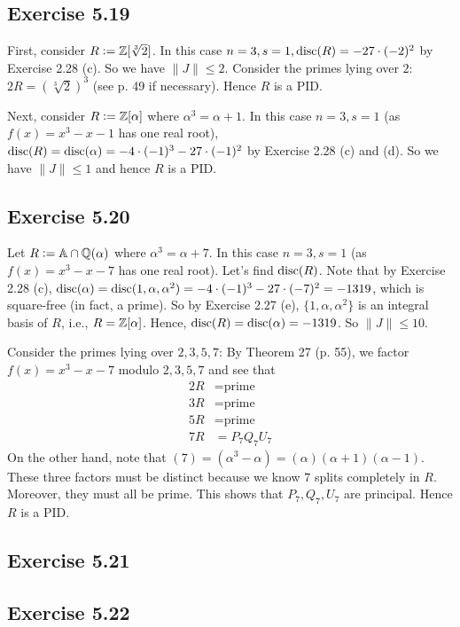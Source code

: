 \documentclass[../Marcus.tex]{subfiles}
\begin{document}
\subsection*{Exercise 5.19}

First, consider $R:=\mathbb{Z}[\sqrt[3]{2}]$. In this case $n=3,s=1,\operatorname{disc}(R) = -27\cdot(-2)^2$ by Exercise 2.28 (c). So we have $\|J\| \leq 2$. Consider the primes lying over $2$: $2R=(\sqrt[3]{2})^3$ (see p. 49 if necessary). Hence $R$ is a PID.

Next, consider $R:=\mathbb{Z}[\alpha]$ where $\alpha^3=\alpha+1$. In this case $n=3,s=1$ (as $f(x)=x^3-x-1$ has one real root), $\operatorname{disc}(R) = \operatorname{disc}(\alpha) = -4\cdot(-1)^3-27\cdot(-1)^2$ by Exercise 2.28 (c) and (d). So we have $\|J\| \leq 1$ and hence $R$ is a PID.

\subsection*{Exercise 5.20}

Let $R:=\mathbb{A}\cap\mathbb{Q}(\alpha)$ where $\alpha^3=\alpha+7$. In this case $n=3,s=1$ (as $f(x)=x^3-x-7$ has one real root). Let's find $\operatorname{disc}(R)$. Note that by Exercise 2.28 (c), $\operatorname{disc}(\alpha) = \operatorname{disc}(1,\alpha,\alpha^2) = -4\cdot(-1)^3-27\cdot(-7)^2 = -1319$, which is square-free (in fact, a prime). So by Exercise 2.27 (e), $\{1,\alpha,\alpha^2\}$ is an integral basis of $R$, i.e., $R=\mathbb{Z}[\alpha]$. Hence, $\operatorname{disc}(R) = \operatorname{disc}(\alpha) = -1319$. So $\|J\| \leq 10$.

Consider the primes lying over $2,3,5,7$: By Theorem 27 (p. 55), we factor $f(x)=x^3-x-7$ modulo $2,3,5,7$ and see that
\begin{align*}
2R &= \text{prime}    \\
3R &= \text{prime}    \\
5R &= \text{prime}    \\
7R &= P_7Q_7U_7
\end{align*}
On the other hand, note that $(7) = (\alpha^3-\alpha) = (\alpha)(\alpha+1)(\alpha-1)$. These three factors must be distinct because we know $7$ splits completely in $R$. Moreover, they must all be prime. This shows that $P_7,Q_7,U_7$ are principal. Hence $R$ is a PID.

\subsection*{Exercise 5.21}

\subsection*{Exercise 5.22}
\end{document}
